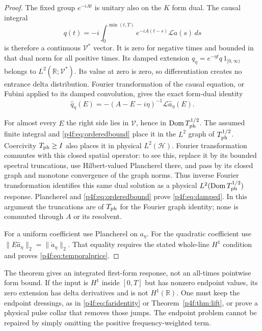 \documentclass[11pt]{article}
\numberwithin{equation}{section}
\theoremstyle{definition}
\theoremstyle{remark}
\begin{document}
\begin{proof}
The fixed group $e^{-iAt}$ is unitary also on
the $K$ form dual. The causal integral
\[
 q(t)=-i\int_0^{\min(t,T)}
                    e^{-iA(t-s)}\mathcal L a(s)\,ds
\]
is therefore a continuous $\mathcal V^*$ vector.
It is zero for negative times and bounded in that
dual norm for all positive times. Its damped
extension $q_\eta=e^{-\eta t}q\,1_{[0,\infty)}$
belongs to $L^2(\mathbb R;\mathcal V^*)$.
Its value at zero is zero, so differentiation
creates no entrance delta distribution.
Fourier transformation of the causal equation,
or Fubini applied to its damped convolution, gives
the exact form-dual identity
\begin{equation}\label{p4f:eq:fourierresponse}
 \widehat q_\eta(E)
       =-(A-E-i\eta)^{-1}\mathcal L\widehat a_\eta(E).
\end{equation}

For almost every $E$ the right side lies in
$\mathcal V$, hence in
$\operatorname{Dom}T_{\rm ph}^{1/2}$. The assumed
finite integral and \eqref{p4f:eq:orderedbound}
place it in the $L^2$ graph of
$T_{\rm ph}^{1/2}$. Coercivity $T_{\rm ph}\ge I$
also places it in physical $L^2(\mathcal H)$.
Fourier transformation commutes with this closed
spatial operator: to see this, replace it by its
bounded spectral truncations, use Hilbert-valued
Plancherel there, and pass by its closed graph
and monotone convergence of the graph norms.
Thus inverse Fourier transformation identifies
this same dual solution as a physical
$L^2(\operatorname{Dom}T_{\rm ph}^{1/2})$ response.
Plancherel and \eqref{p4f:eq:orderedbound} prove
\eqref{p4f:eq:damped}. In this argument the
truncations are of $T_{\rm ph}$ for the Fourier
graph identity; none is commuted through $A$
or its resolvent.

For a uniform coefficient use Plancherel on
$a_\eta$. For the quadratic coefficient use
$\|E\widehat a_\eta\|_2=\|\dot a_\eta\|_2$.
That equality requires the stated whole-line
$H^1$ condition and proves \eqref{p4f:eq:temporalprice}.
\end{proof}

The theorem gives an integrated first-form response,
not an all-times pointwise form bound. If the input
is $H^1$ inside $[0,T]$ but has nonzero endpoint
values, its zero extension has delta derivatives
and is not $H^1(\mathbb R)$. One must keep the
endpoint dressings, as in
\eqref{p4f:eq:faridentity} or
Theorem~\ref{p4f:thm:lift}, or prove a physical
pulse collar that removes those jumps.
The endpoint problem cannot be repaired by simply
omitting the positive frequency-weighted term.
\end{document}
